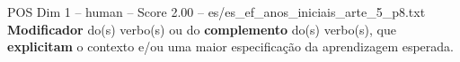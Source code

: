 \begin{textsample}{POS Dim 1 – human – Score 2.00 – es/es\_ef\_anos\_iniciais\_arte\_5\_p8.txt}  \label{ex:f1_pos_007}
\textbf{Modificador} do(s) verbo(s) ou do \textbf{complemento} do(s) verbo(s), que \textbf{explicitam} o contexto e/ou uma maior especificação da aprendizagem esperada.

\end{textsample}
